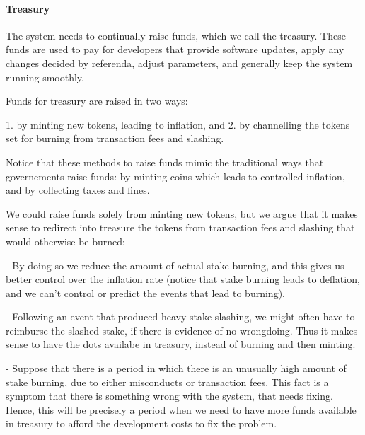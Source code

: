  \paragraph{Treasury}

 The system needs to continually raise funds, which we call the treasury.
 These funds are used to pay for developers that provide software updates, apply any changes decided by referenda, adjust parameters, and generally keep the system running smoothly.

 Funds for treasury are raised in two ways:

 1.   by minting new tokens, leading to inflation, and
 2.   by channelling the tokens set for burning from transaction fees and slashing.

 Notice that these methods to raise funds mimic the traditional ways that governements raise funds: by minting coins which leads to controlled inflation, and by collecting taxes and fines.

 We could raise funds solely from minting new tokens, but we argue that it makes sense to redirect into treasure the tokens from transaction fees and slashing that would otherwise be burned:

 - By doing so we reduce the amount of actual stake burning, and this gives us better control over the inflation rate (notice that stake burning leads to deflation, and we can’t control or predict the events that lead to burning).

 - Following an event that produced heavy stake slashing, we might often have to reimburse the slashed stake, if there is evidence of no wrongdoing. Thus it makes sense to have the dots availabe in treasury, instead of burning and then minting.

 - Suppose that there is a period in which there is an unusually high amount of stake burning, due to either misconducts or transaction fees. This fact is a symptom that there is something wrong with the system, that needs fixing. Hence, this will be precisely a period when we need to have more funds available in treasury to afford the development costs to fix the problem.
